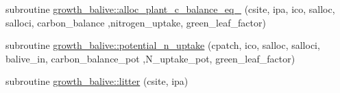 \begin{DoxyCompactItemize}
subroutine \hyperlink{namespacegrowth__balive_a1990f1f2512a5c36c291f32fb7cc8669}{growth\+\_\+balive\+::alloc\+\_\+plant\+\_\+c\+\_\+balance\+\_\+eq\+\_} (csite, ipa, ico, salloc, salloci, carbon\+\_\+balance                                                                                                                                                                                   ,nitrogen\+\_\+uptake, green\+\_\+leaf\+\_\+factor)
\item 
subroutine \hyperlink{namespacegrowth__balive_a4e594938a177edfffccb92437a01074f}{growth\+\_\+balive\+::potential\+\_\+n\+\_\+uptake} (cpatch, ico, salloc, salloci, balive\+\_\+in, carbon\+\_\+balance\+\_\+pot                                                                                                                                       ,N\+\_\+uptake\+\_\+pot, green\+\_\+leaf\+\_\+factor)
\item 
subroutine \hyperlink{namespacegrowth__balive_affc86c9f292d8fa6d67dfe1d0df69337}{growth\+\_\+balive\+::litter} (csite, ipa)
\end{DoxyCompactItemize}
